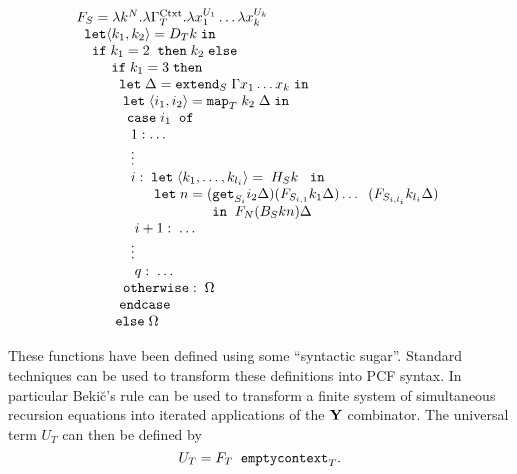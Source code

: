 \documentclass[11pt]{article}
\newcommand{\lang}{\langle}
\newcommand{\rang}{\rangle}
\begin{document}
\[ \begin{array}{l}
F_S=  \lambda k^{N}.\lambda \Gamma^{{\rm Ctxt}}_T.\lambda x_1^{U_1}\dots
\lambda x_k^{U_k}\\
\;\; {\tt let }\lang k_1,k_2\rang = D_T k \;{\tt in } \\
\;\;\;\; {\tt if }\; k_1=2 \;\; {\tt then }\; k_2 \; {\tt else}\\
\;\;\;\;\;\;\;\;\; {\tt if }\; k_1=3 \; {\tt then }\\
 \;\;\;\;\;\;\;\;\;\;\; {\tt let }\;  \Delta ={\tt extend}_S \;\Gamma x_1\dots
x_k \;  {\tt in}\\
\;\;\;\;\;\;\;\;\;\;\;\; {\tt let } \; \lang i_1,i_2\rang  = {\tt map}_T \;k_2\;
\Delta \;  {\tt in} \\
\;\;\;\;\;\;\;\;\;\;\;\;\;{\tt case }\; i_1 \;\; {\tt of } \\
\;\;\;\;\;\;\;\;\; \;\;\;\;\; 1 :  \dots  \\
\;\;\;\;\;\;\;\;\;\;\;\;\; \; \vdots  \\
\;\;\;\;\;\;\;\;\;\;\;\;\;  \; i: \; {\tt let }\;\lang k_1,\dots,k_{l_i}\rang
=\; H_S k \;\;\; {\tt in} \\
\;\;\;\;\;\;\;\;\;\;\;\;\;\;\;\;\;\;\;  \;{\tt let }\;n= ({\tt get}_{S_i}
i_2\Delta)(F_{S_{i,1}}  k_1\Delta) \dots\;\;(F_{S_{i,l_i}}k_{l_i}\Delta) \; \\
\;\;\;\;\;\;\;\;\;\;\;\;\;\;\;\;\;\;\;\;\;\;\;\;\;\; \;\;\;\;\;\;\;\;
\; {\tt in} \;\;F_N(B_S k n) \Delta\\
\;\;\;\;\;\;\;\;\;\;\;\;\;\;\;i+1 : \; \dots \\
\;\;\;\;\;\;\;\;\;\;\;\;\; \; \vdots  \\
\;\;\;\;\;\;\;\;\;\;\;\;\;\;\; q :  \; \dots \\
\;\;\;\;\;\;\;\;\;\;\;\; {\tt otherwise}: \; \Omega\\
\;\;\;\;\;\;\;\;\;\;\; {\tt endcase} \\
\;\;\;\;\;\;\;\;\;\;{\tt else} \; \Omega
\end{array} \]

These functions have been defined using some ``syntactic sugar''.
Standard techniques can be used to transform these definitions
into PCF syntax. In particular Beki\u{c}'s rule
\cite{WinskelG:fspl} can be used to transform a finite system of
simultaneous recursion equations into iterated applications of the
${\bf Y}$ combinator. The universal term $U_T$ can then be defined
by $$U_T=F_T \;\;{\tt emptycontext}_T.$$
\end{document}
